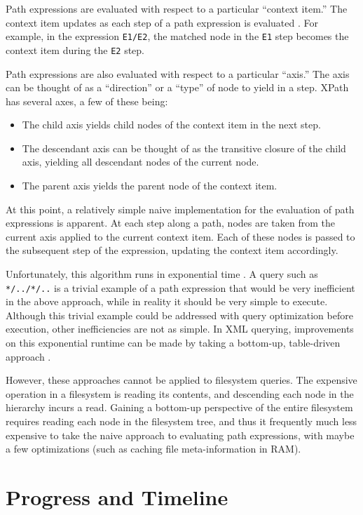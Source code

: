 \documentclass{scrartcl}
\begin{document}
Path expressions are evaluated with respect to a particular ``context item.''
The context item updates as each step of a path expression is evaluated
\cite{xpath}. For example, in the expression \texttt{E1/E2}, the matched node in
the \texttt{E1} step becomes the context item during the \texttt{E2} step.

Path expressions are also evaluated with respect to a particular ``axis.'' The
axis can be thought of as a ``direction'' or a ``type'' of node to yield in a
step. XPath has several axes, a few of these being:

\begin{itemize}
\item The child axis yields child nodes of the context item in the next step.
\item The descendant axis can be thought of as the transitive closure of the
  child axis, yielding all descendant nodes of the current node.
\item The parent axis yields the parent node of the context item.
\end{itemize}

At this point, a relatively simple naive implementation for the evaluation of
path expressions is apparent. At each step along a path, nodes are taken from
the current axis applied to the current context item. Each of these nodes is
passed to the subsequent step of the expression, updating the context item
accordingly.

Unfortunately, this algorithm runs in exponential time \cite{efficient}. A query
such as \texttt{*/../*/..} is a trivial example of a path expression that would
be very inefficient in the above approach, while in reality it should be very
simple to execute. Although this trivial example could be addressed with query
optimization before execution, other inefficiencies are not as simple. In XML
querying, improvements on this exponential runtime can be made by taking a
bottom-up, table-driven approach \cite{efficient}.

However, these approaches cannot be applied to filesystem queries. The expensive
operation in a filesystem is reading its contents, and descending each node in
the hierarchy incurs a read. Gaining a bottom-up perspective of the entire
filesystem requires reading each node in the filesystem tree, and thus it
frequently much less expensive to take the naive approach to evaluating path
expressions, with maybe a few optimizations (such as caching file
meta-information in RAM).

\section{Progress and Timeline}
\end{document}
